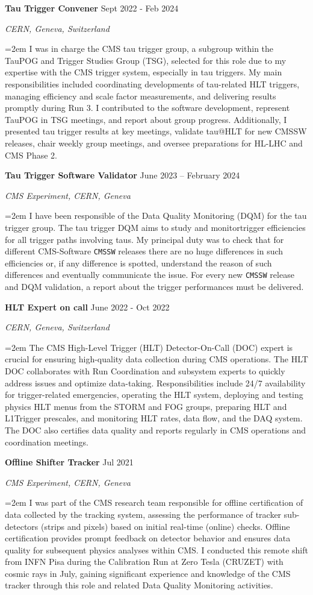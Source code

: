 \documentclass[fontsize=12pt]{article} %
\newcommand{\sepspace}{\vspace*{1em}}		%
\newcommand{\EducationEntry}[4]{
	\noindent \textbf{#1} \hfill      %
	{#2} \par  %
	\noindent \textit{#3} \par        %
	\noindent\hangindent=2em\hangafter=0 \small #4 %
	\normalsize \par}
\begin{document}
	\sepspace
	\EducationEntry{Tau Trigger Convener}{Sept 2022 - Feb 2024}{CERN, Geneva, Switzerland}{
		I was in charge the CMS tau trigger group, a subgroup within the TauPOG and Trigger Studies Group (TSG), selected for this role due to my expertise with the CMS trigger system, especially in tau triggers. My main responsibilities included coordinating developments of tau-related HLT triggers, managing efficiency and scale factor measurements, and delivering results promptly during Run 3. I contributed to the software development, represent TauPOG in TSG meetings, and report about group progress. Additionally, I presented tau trigger results at key meetings, validate tau@HLT for new CMSSW releases, chair weekly group meetings, and oversee preparations for HL-LHC and CMS Phase 2.}
	\sepspace
    \EducationEntry{Tau Trigger Software Validator}{June 2023 {--} February 2024}{CMS Experiment, CERN, Geneva}{I have been responsible of the Data Quality Monitoring (DQM) for the tau trigger group. The tau trigger DQM aims to study and monitortrigger efficiencies for all trigger paths involving taus. My principal duty was to check that for different CMS-Software \texttt{CMSSW} releases there are no huge differences in such efficiencies or, if any difference is spotted, understand the reason of such differences and eventually communicate the issue. For every new \texttt{CMSSW} release and DQM validation, a report about the trigger performances must be delivered.}
    \sepspace
	\EducationEntry{HLT Expert on call}{June 2022 - Oct 2022}{CERN, Geneva, Switzerland}{
		The CMS High-Level Trigger (HLT) Detector-On-Call (DOC) expert is crucial for ensuring high-quality data collection during CMS operations. The HLT DOC collaborates with Run Coordination and subsystem experts to quickly address issues and optimize data-taking. Responsibilities include 24/7 availability for trigger-related emergencies, operating the HLT system, deploying and testing physics HLT menus from the STORM and FOG groups, preparing HLT and L1Trigger prescales, and monitoring HLT rates, data flow, and the DAQ system. The DOC also certifies data quality and reports regularly in CMS operations and coordination meetings.}
\sepspace
	\EducationEntry{Offline Shifter Tracker}{Jul 2021}{CMS Experiment, CERN, Geneva}{I was part of the CMS research team responsible for offline certification of data collected by the tracking system, assessing the performance of tracker sub-detectors (strips and pixels) based on initial real-time (online) checks. Offline certification provides prompt feedback on detector behavior and ensures data quality for subsequent physics analyses within CMS. I conducted this remote shift from INFN Pisa during the Calibration Run at Zero Tesla (CRUZET) with cosmic rays in July, gaining significant experience and knowledge of the CMS tracker through this role and related Data Quality Monitoring activities.}
\end{document}
